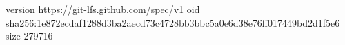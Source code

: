 version https://git-lfs.github.com/spec/v1
oid sha256:1e872ecdaf1288d3ba2aecd73c4728bb3bbc5a0e6d38e76ff017449bd2d1f5e6
size 279716
